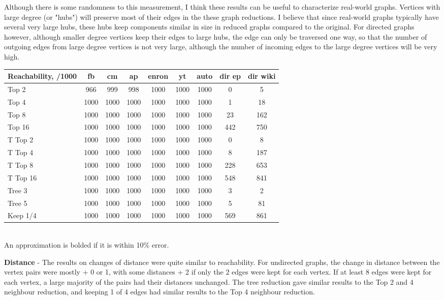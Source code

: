\documentclass[11pt]{article}
\begin{document}
Although there is some randomness to this measurement, I think these results can be useful to characterize real-world graphs.  Vertices with large degree (or "hubs") will preserve most of their edges in the these graph reductions.  I believe that since real-world graphs typically have several very large hubs, these hubs keep components similar in size in reduced graphs compared to the original.  For directed graphs however, although smaller degree vertices keep their edges to large hubs, the edge can only be traversed one way, so that the number of outgoing edges from large degree vertices is not very large, although the number of incoming edges to the large degree vertices will be very high.

\begin{tabular}{| l | c | c | c | c | c | c | c | c |}
	\hline
	Reachability, /1000 & \textbf{fb} & \textbf{cm} & \textbf{ap} & \textbf{enron} & \textbf{yt} & \textbf{auto} & dir ep & dir wiki \\ \hline
	Top 2 & 966 & 999 & 998 & 1000 & 1000 & 1000 & 0 & 5\\ \hline
	Top 4 & 1000 & 1000 & 1000 & 1000 & 1000 & 1000 & 1 & 18\\ \hline
	Top 8 & 1000 & 1000 & 1000 & 1000 & 1000 & 1000 & 23 & 162\\ \hline
	Top 16 & 1000 & 1000 & 1000 & 1000 & 1000 & 1000 & 442 & 750\\ \hline
	T Top 2 & 1000 & 1000 & 1000 & 1000 & 1000 & 1000 & 0 & 8\\ \hline
	T Top 4 & 1000 & 1000 & 1000 & 1000 & 1000 & 1000 & 8 & 187\\ \hline
	T Top 8 & 1000 & 1000 & 1000 & 1000 & 1000 & 1000 & 228 & 653 \\ \hline 
	T Top 16 & 1000 & 1000 & 1000 & 1000 & 1000 & 1000 & 548 & 841\\ \hline
	Tree 3 & 1000 & 1000 & 1000 & 1000 & 1000 & 1000 & 3 & 2\\ \hline
	Tree 5 & 1000 & 1000 & 1000 & 1000 & 1000 & 1000 & 5 & 81\\ \hline
	Keep 1/4 & 1000 & 1000 & 1000 & 1000 & 1000 & 1000 & 569 & 861 \\ \hline

\end{tabular}\\
An approximation is bolded if it is within 10\% error.

\textbf{Distance} - The results on changes of distance were quite similar to reachability.  For undirected graphs, the change in distance between the vertex pairs were mostly + 0 or 1, with some distances + 2 if only the 2 edges were kept for each vertex.  If at least 8 edges were kept for each vertex, a large majority of the pairs had their distances unchanged. The tree reduction gave similar results to the Top 2 and 4 neighbour reduction, and keeping 1 of 4 edges had similar results to the Top 4 neighbour reduction.
\end{document}
